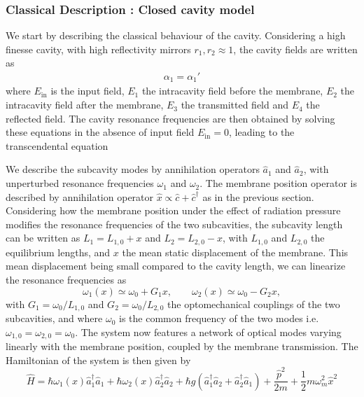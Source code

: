 \subsubsection{Classical Description : Closed cavity model}
We start by describing the classical behaviour of the cavity. Considering a high finesse cavity, with high reflectivity mirrors \(r_1, r_2 \approx 1\), the cavity fields are written as 
\begin{equation}
\begin{aligned}
\alpha_1 = \alpha_1'
\end{aligned}
\end{equation}
where \(E_{\mathrm{in}}\) is the input field, \(E_1\) the intracavity field before the membrane, \(E_2\) the intracavity field after the membrane, \(E_3\) the transmitted field and \(E_4\) the reflected field. The cavity resonance frequencies are then obtained by solving these equations in the absence of input field \(E_{\mathrm{in}}=0\), leading to the transcendental equation \cite{jayich_dispersive_2008}



We describe the subcavity modes by annihilation operators \( \hat a_1\) and \(\hat a_2\), with unperturbed resonance frequencies \(\omega_1\) and \(\omega_2\). The membrane position operator is described by annihilation operator $\hat x \propto \hat c + \hat c^{\dagger} $ as in the previous section. Considering how the membrane position under the effect of radiation pressure modifies the resonance frequencies of the two subcavities, the subcavity length can be written as \(L_1 = L_{1,0} +  x\) and \(L_2 = L_{2,0} -  x\), with \(L_{1,0}\) and \(L_{2,0}\) the equilibrium lengths, and $x$ the mean static displacement of the membrane. This mean displacement being small compared to the cavity length, we can linearize the resonance frequencies as
\begin{equation}
\omega_1(x) \simeq \omega_{0} + G_1 x, \qquad \omega_2(x) \simeq \omega_{0} - G_2 x,
\end{equation}
with \(G_1 = \omega_{0}/L_{1,0}\) and \(G_2 = \omega_{0}/L_{2,0}\) the optomechanical couplings of the two subcavities, and where \(\omega_{0}\) is the common frequency of the two modes i.e. \(\omega_{1,0} = \omega_{2,0} = \omega_{0}\). The system now features a network of optical modes varying linearly with the membrane position, coupled by the membrane transmission. The Hamiltonian of the system is then given by \cite{xu_cavity_2016}
\begin{equation}
\hat{H} = \hbar \omega_1(x) \hat a_1^\dagger \hat{a}_1 + \hbar \omega_2(x) \hat{a}_2^\dagger \hat{a}_2 + \hbar g(\hat{a}_1^\dagger \hat{a}_2 + \hat{a}_2^\dagger \hat{a}_1) + \frac{\hat{p}^2}{2m} + \frac{1}{2} m \omega_m^2 \hat{x}^2
\end{equation}


